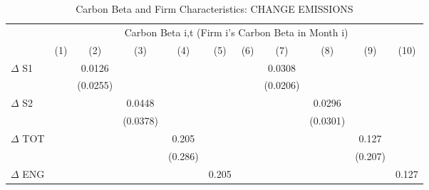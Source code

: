 \begin{table}[htbp]\centering
\def\sym#1{\ifmmode^{#1}\else\(^{#1}\)\fi}
\caption{Carbon Beta and Firm Characteristics: CHANGE EMISSIONS}
\begin{tabular}{l*{10}{c}}
\hline\hline
                &\multicolumn{10}{c}{Carbon Beta i,t (Firm i's Carbon Beta in Month i)}                                                                                                                       \\\cmidrule(lr){2-11}
                &\multicolumn{1}{c}{(1)}         &\multicolumn{1}{c}{(2)}         &\multicolumn{1}{c}{(3)}         &\multicolumn{1}{c}{(4)}         &\multicolumn{1}{c}{(5)}         &\multicolumn{1}{c}{(6)}         &\multicolumn{1}{c}{(7)}         &\multicolumn{1}{c}{(8)}         &\multicolumn{1}{c}{(9)}         &\multicolumn{1}{c}{(10)}         \\
\hline
$\Delta$ S1     &                  &   0.0126         &                  &                  &                  &                  &   0.0308         &                  &                  &                  \\
                &                  & (0.0255)         &                  &                  &                  &                  & (0.0206)         &                  &                  &                  \\
$\Delta$ S2     &                  &                  &   0.0448         &                  &                  &                  &                  &   0.0296         &                  &                  \\
                &                  &                  & (0.0378)         &                  &                  &                  &                  & (0.0301)         &                  &                  \\
$\Delta$ TOT    &                  &                  &                  &    0.205         &                  &                  &                  &                  &    0.127         &                  \\
                &                  &                  &                  &  (0.286)         &                  &                  &                  &                  &  (0.207)         &                  \\
$\Delta$ ENG    &                  &                  &                  &                  &    0.205         &                  &                  &                  &                  &    0.127         \\

\end{tabular}
\end{table}
